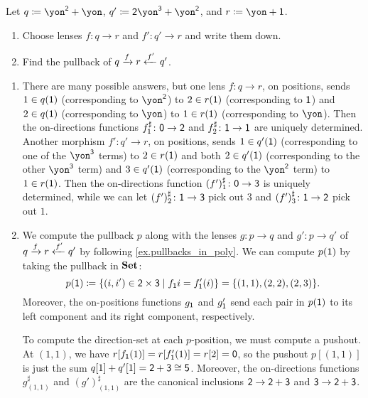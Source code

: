 \documentclass[Book-Poly]{subfiles}
\begin{document}
\begin{exercise}
Let $q\coloneqq \yon^\2+\yon$, $q'\coloneqq\2\yon^\3+\yon^\2$, and $r\coloneq\yon+\1$.
\begin{enumerate}
	\item Choose lenses $f\colon q\to r$ and $f'\colon q'\to r$ and write them down.
	\item Find the pullback of $q\xrightarrow{f} r\xleftarrow{f'} q'$.
\qedhere
\end{enumerate}
\begin{solution}
\begin{enumerate}
    \item There are many possible answers, but one lens $f \colon q \to r$, on positions, sends $1 \in q(\textsf{1})$ (corresponding to $\yon^\2$) to $2 \in r(\textsf{1})$ (corresponding to $\textsf{1}$) and $2 \in q(\textsf{1})$ (corresponding to $\yon$) to $1 \in r(\textsf{1})$ (corresponding to $\yon$).
    Then the on-directions functions $f^\sharp_{\textsf{1}} \colon \textsf{0} \to \textsf{2}$ and $f^\sharp_2 \colon \textsf{1} \to \textsf{1}$ are uniquely determined.
    Another morphism $f' \colon q' \to r$, on positions, sends $1 \in q'(\textsf{1})$ (corresponding to one of the $\yon^\3$ terms) to $2 \in r(\textsf{1})$ and both $2 \in q'(\textsf{1})$ (corresponding to the other $\yon^\3$ term) and $3 \in q'(\textsf{1})$ (corresponding to the $\yon^\2$ term) to $1 \in r(\textsf{1})$.
    Then the on-directions function $(f')^\sharp_1 \colon \textsf{0} \to \textsf{3}$ is uniquely determined, while we can let $(f')^\sharp_2 \colon \textsf{1} \to \textsf{3}$ pick out $3$ and $(f')^\sharp_3 \colon \textsf{1} \to \textsf{2}$ pick out $1$.

    \item We compute the pullback $p$ along with the lenses $g \colon p \to q$ and $g' \colon p \to q'$ of $q\xrightarrow{f} r\xleftarrow{f'} q'$ by following \cref{ex.pullbacks_in_poly}.
    We can compute $p(\textsf{1})$ by taking the pullback in $\mathbf{Set}$:
    \[
        p(\textsf{1}) \coloneqq \{(i, i') \in \textsf{2} \times \textsf{3} \mid f_{\textsf{1}}i = f'_{\textsf{1}}(i)\} = \{(1,1), (2,2), (2,3)\}.
    \]
    Moreover, the on-positions functions $g_{\textsf{1}}$ and $g'_{\textsf{1}}$ send each pair in $p(\textsf{1})$ to its left component and its right component, respectively.

    To compute the direction-set at each $p$-position, we must compute a pushout.
    At $(1,1)$, we have $r[f_{\textsf{1}}(1)] = r[f'_{\textsf{1}}(1)] = r[2] = \textsf{0}$, so the pushout $p[(1,1)]$ is just the sum $q[1] + q'[1] = \textsf{2} + \textsf{3} \cong \textsf{5}$.
    Moreover, the on-directions functions $g^\sharp_{(1,1)}$ and $(g')^\sharp_{(1,1)}$ are the canonical inclusions $\textsf{2} \to \textsf{2} + \textsf{3}$ and $\textsf{3} \to \textsf{2} + \textsf{3}$.


\end{enumerate}
\end{solution}
\end{exercise}
\end{document}
